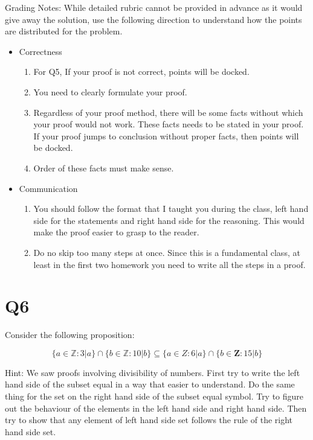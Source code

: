 \documentclass[12pt]{exam}
\begin{document}
Grading Notes:
While detailed rubric cannot be provided in advance as it would give away the solution, use the following direction to understand how the points are distributed for the problem.
\begin{itemize}
    \item Correctness
        \begin{enumerate}
            \item For Q5, If your proof is not correct, points will be docked.
            \item You need to clearly formulate your proof.
            \item Regardless of your proof method, there will be some facts without which your proof would not work. These facts needs to be stated in your proof. If your proof jumps to conclusion without proper facts, then points will be docked.
            \item Order of these facts must make sense. 
        \end{enumerate}
        \subitem  
       
    \item Communication 
    \begin{enumerate}
        \item You should follow the format that I taught you during the class, left hand side for the statements and right hand side for the reasoning. This would make the proof easier to grasp to the reader.
        \item Do no skip too many steps at once. Since this is a fundamental class, at least in the first two homework you need to write all the steps in a proof.  
    \end{enumerate}
        
\end{itemize}

\section{Q6}
Consider the following proposition: 

\[ \{a \in \mathds{Z}: 3 | a \} \cap \{ b \in \mathds{Z} : 10 | b\} \subseteq \{ a \in Z: 6| a\} \cap \{ b \in \mathbf{Z} : 15|b\}\]

Hint: We saw proofs involving divisibility of numbers. First try to write the left hand side of the subset equal in a way that easier to understand. Do the same thing for the set on the right hand side of the subset equal symbol. Try to figure out the behaviour of the elements in the left hand side and right hand side. Then try to show that any element of left hand side set follows the rule of the right hand side set. 
\end{document}
